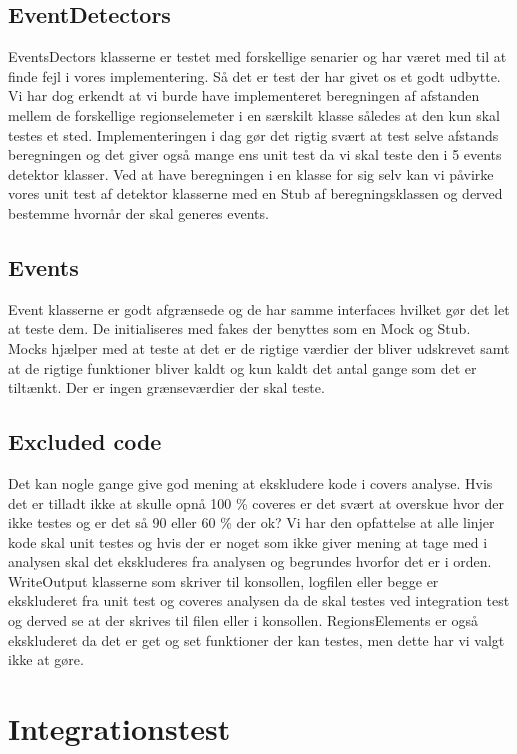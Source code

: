 \subsection{EventDetectors}
EventsDectors klasserne er testet med forskellige senarier og har været med til at finde fejl i vores implementering. Så det er test der har givet os et godt udbytte. Vi har dog erkendt at vi burde have implementeret beregningen af afstanden mellem de forskellige regionselemeter i en særskilt klasse således at den kun skal testes et sted. Implementeringen i dag gør det rigtig svært at test selve afstands beregningen og det giver også mange ens unit test da vi skal teste den i 5 events detektor klasser. Ved at have beregningen i en klasse for sig selv kan vi påvirke vores unit test af detektor klasserne med en Stub af beregningsklassen og derved bestemme hvornår der skal generes events.

\subsection{Events}
Event klasserne er godt afgrænsede og de har samme interfaces hvilket gør det let at teste dem. De initialiseres med fakes der benyttes som en Mock og Stub. Mocks hjælper med at teste at det er de rigtige værdier der bliver udskrevet samt at de rigtige funktioner bliver kaldt og kun kaldt det antal gange som det er tiltænkt. Der er ingen grænseværdier der skal teste.

\subsection{Excluded code}
Det kan nogle gange give god mening at ekskludere kode i covers analyse. Hvis det er tilladt ikke at skulle opnå 100 \% coveres er det svært at overskue hvor der ikke testes og er det så 90 eller 60 \% der ok? Vi har den opfattelse at alle linjer kode skal unit testes og hvis der er noget som ikke giver mening at tage med i analysen skal det ekskluderes fra analysen og begrundes hvorfor det er i orden.
WriteOutput klasserne som skriver til konsollen, logfilen eller begge er ekskluderet fra unit test og coveres analysen da de skal testes ved integration test og derved se at der skrives til filen eller i konsollen. 
RegionsElements er også ekskluderet da det er get og set funktioner der kan testes, men dette har vi valgt ikke at gøre.

\section{Integrationstest}


